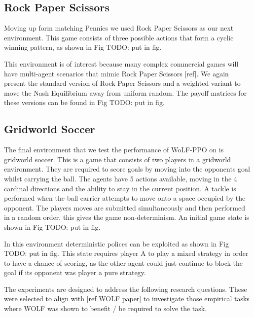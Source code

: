\documentclass{article}
\newcommand\TODO[1]{{\color{red}TODO: #1}}
\begin{document}
\subsection{Rock Paper Scissors}

Moving up form matching Pennies we used Rock Paper Scissors as our next environment. This game consists of three possible actions that form a cyclic winning pattern, as shown in Fig \TODO{put in fig}.

This environment is of interest because many complex commercial games will have multi-agent scenarios that mimic Rock Paper Scissors [ref]. We again present the standard version of Rock Paper Scissors and a weighted variant to move the Nash Equilibrium away from uniform random. The payoff matrices for these versions can be found in Fig \TODO{put in fig}.

\subsection{Gridworld Soccer}

The final environment that we test the performance of WoLF-PPO on is gridworld soccer. This is a game that consists of two players in a gridworld environment. They are required to score goals by moving into the opponents goal whilst carrying the ball. The agents have 5 actions available, moving in the 4 cardinal directions and the ability to stay in the current position. A tackle is performed when the ball carrier attempts to move onto a space occupied by the opponent. The players moves are submitted simultaneously and then performed in a random order, this gives the game non-determinism. An initial game state is shown in Fig \TODO{put in fig}.

In this environment deterministic polices can be exploited as shown in Fig \TODO{put in fig}. This state requires player A to play a mixed strategy in order to have a chance of scoring, as the other agent could just continue to block the goal if its opponent was player a pure strategy. 

The experiments are designed to address the following research questions. These were selected to align with [ref WOLF paper] to investigate those empirical tasks where WOLF was shown to benefit / be required to solve the task.
\end{document}
